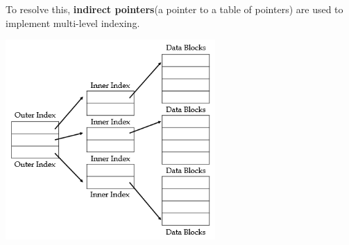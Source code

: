      To resolve this, \textbf{indirect pointers}(a pointer to a table of pointers) are used to implement multi-level 
     indexing. 

     \includegraphics[width=0.6\textwidth]{chapters/Persistence/persistence/multi_level_index.png}









